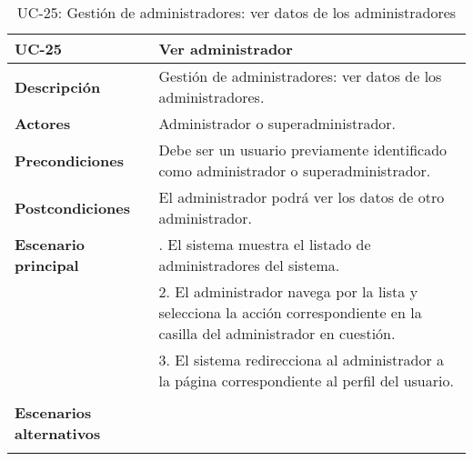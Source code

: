 \begin{table}[H]
  \begin{center}
    \begin{tabularx}{16.4cm}{|l|X|}
      \hline
      \textbf{UC-25} & \textbf{Ver administrador}\\
      \hline
      \textbf{Descripción} & Gestión de administradores: ver datos de los administradores. \\
      \hline
      \textbf{Actores} & Administrador o superadministrador.\\
      \hline
      \textbf{Precondiciones} & Debe ser un usuario previamente identificado como administrador o superadministrador.\\
      \hline
      \textbf{Postcondiciones} & El administrador podrá ver los datos de otro administrador.\\
      \hline
      \textbf{Escenario principal} & \smallskip 1. El sistema muestra el listado de administradores del sistema.\\
      & 2. El administrador navega por la lista y selecciona la acción correspondiente en la casilla del administrador en cuestión.\\
      & 3. El sistema redirecciona al administrador a la página correspondiente al perfil del usuario.\\
      & \\
      \hline
      \textbf{Escenarios alternativos} & \\
      & \\
      \hline
    \end{tabularx}
    \caption{UC-25: Gestión de administradores: ver datos de los administradores}
  \end{center}
\end{table}


